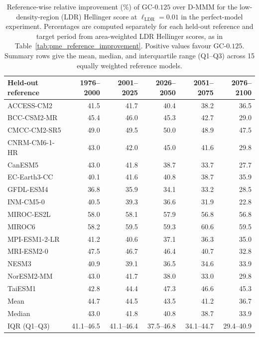 \begin{table}[p]
\centering
\small
\setlength{\tabcolsep}{4pt}
\caption{Reference-wise relative improvement (\%) of GC-\(0.125\) over D-MMM for the low-density-region (LDR) Hellinger score at \(\ell_{\mathrm{LDR}}=0.01\) in the perfect-model experiment. Percentages are computed separately for each held-out reference and target period from area-weighted LDR Hellinger scores, as in Table~\ref{tab:pme_reference_improvement}. Positive values favour GC-\(0.125\). Summary rows give the mean, median, and interquartile range (Q1--Q3) across 15 equally weighted reference models.}
\label{tab:pme_reference_improvement_ldr}
\begin{tabular}{lrrrrr}
\toprule
Held-out reference & 1976--2000 & 2001--2025 & 2026--2050 & 2051--2075 & 2076--2100 \\
\midrule
ACCESS-CM2 & 41.5 & 41.7 & 40.4 & 38.2 & 36.5 \\
BCC-CSM2-MR & 45.4 & 46.0 & 45.3 & 42.7 & 29.0 \\
CMCC-CM2-SR5 & 49.0 & 49.5 & 50.0 & 48.9 & 47.5 \\
CNRM-CM6-1-HR & 43.0 & 42.0 & 45.0 & 41.6 & 29.8 \\
CanESM5 & 43.0 & 41.8 & 38.7 & 33.7 & 27.7 \\
EC-Earth3-CC & 40.1 & 41.6 & 40.8 & 38.7 & 35.9 \\
GFDL-ESM4 & 36.8 & 35.9 & 34.1 & 33.2 & 28.5 \\
INM-CM5-0 & 40.5 & 39.3 & 36.6 & 31.9 & 22.8 \\
MIROC-ES2L & 58.0 & 58.1 & 57.9 & 56.8 & 56.8 \\
MIROC6 & 58.2 & 59.5 & 59.3 & 60.6 & 59.5 \\
MPI-ESM1-2-LR & 41.2 & 40.6 & 37.1 & 36.3 & 35.0 \\
MRI-ESM2-0 & 47.5 & 46.7 & 46.4 & 40.7 & 32.8 \\
NESM3 & 40.9 & 39.1 & 36.5 & 34.6 & 33.9 \\
NorESM2-MM & 43.0 & 41.7 & 38.0 & 33.0 & 29.8 \\
TaiESM1 & 42.8 & 44.4 & 47.3 & 46.6 & 45.3 \\
\midrule
Mean & 44.7 & 44.5 & 43.5 & 41.2 & 36.7 \\
Median & 43.0 & 41.8 & 40.8 & 38.7 & 33.9 \\
IQR (Q1--Q3) & 41.1--46.5 & 41.1--46.4 & 37.5--46.8 & 34.1--44.7 & 29.4--40.9 \\
\bottomrule
\end{tabular}
\end{table}
